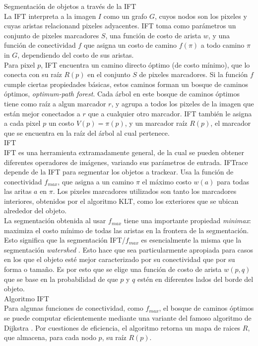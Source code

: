 \documentclass[a4paper,10pt]{article}
\begin{document}
Segmentación de objetos a través de la IFT\\
La IFT interpreta a la imagen $I$ como un grafo $G$, cuyos nodos son los pixeles y cuyas
aristas relacionand pixeles adyacentes. IFT toma como parámetros un conjunto de 
pixeles marcadores $S$, una función de costo de arista $w$, y una función de 
conectividad $f$ que asigna un costo de camino $f(\pi)$ a todo camino $\pi$ in $G$,
dependiendo del costo de sus aristas.\\
Para pixel $p$, IFT encuentra un camino directo óptimo (de costo mínimo), que lo 
conecta con su raíz $R(p)$ en el conjunto $S$ de pixeles marcadores. Si la función 
$f$ cumple ciertas propiedades básicas, estos caminos forman un bosque de caminos 
óptimos, \textit{optimum-path forest}. Cada árbol en este bosque de caminos óptimos
tiene como raíz a algun marcador $r$, y agrupa a todos los pixeles de la imagen que 
están mejor conectados a $r$ que a cualquier otro marcador. IFT también le asigna a 
cada pixel $p$ un costo $V(p) = \pi(p)$, y un marcador raíz $R(p)$, el marcador 
que se encuentra en la raíz del árbol al cual pertenece.\\

IFT\\
IFT es una herramienta extramadamente general, de la cual se pueden obtener diferentes
operadores de imágenes, variando sus parámetros de entrada. IFTrace depende de la IFT
para segmentar los objetos a trackear. Usa la función de conectividad $f_{max}$, que
asigna a un camino $\pi$ el máximo costo $w(a)$ para todas las aritas $a$ en $\pi$.
Los pixeles marcadores utilizados son tanto los marcadores interiores, obtenidos
por el algoritmo KLT, como los exteriores que se ubican alrededor del objeto.\\
La segmentación obtenida al usar $f_{max}$ tiene una importante propiedad 
\textit{minimax}: maximiza el costo mínimo de todas las aristas en la frontera de la 
segmentación. Esto significa que la segmentación IFT/$f_{max}$ es esencialmente
la misma que la segmentación \textit{watershed} \cite{watershed-segmentation}. Esto 
hace que sea particularmente apropiada para casos en los que el objeto esté 
mejor caracterizado por su conectividad que por su forma o tamaño. Es por esto que 
se elige una función de costo de arista $w(p,q)$ que se base en la probabilidad de 
que $p$ y $q$ estén en diferentes lados del borde del objeto.\\

Algoritmo IFT\\
Para algunas funciones de conectividad, como $f_{max}$, el bosque de caminos
óptimos se puede computar eficientemente mediante una variante del famoso 
algoritmo de Dijkstra \cite{watershed-segmentation}. Por cuestiones de
eficiencia, el algoritmo retorna un mapa de raices $R$, que almacena, para 
cada nodo $p$, su raíz $R(p)$.\\
\end{document}
